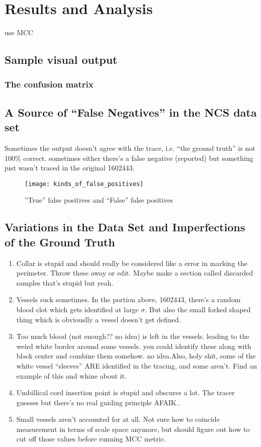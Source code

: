 
\chapter{Results and Analysis}

use MCC \cite{mcc-original-paper}
\section{Sample visual output}
\subsection{The confusion matrix}
\section{A Source of ``False Negatives'' in the NCS data set} \label{sec:NCS-dataset-issues}

Sometimes the output doesn't agree with the trace, i.e. ``the ground truth'' is not 100\% correct.
sometimes either there's a false negative (reported) but something just wasn't traced in the original  1602443.

\begin{figure} \centering
	\texttt{[image: kinds\_of\_false\_positives]}
	\caption{''True'' false positives and ``False'' false positives}
\end{figure}

\section{Variations in the Data Set and Imperfections of the Ground Truth}

\begin{enumerate}
\item Collar is stupid and should really be considered like a error in marking the perimeter. Throw these away or edit. Maybe make a section called discarded samples that's stupid but yeah.
\item Vessels suck sometimes. In the portion above, 1602443, there's a random blood clot which gets identified at large $\sigma$. But also the small forked shaped thing which is obviouslly a vessel doesn't get defined.
\item Too much blood (not enough?? no idea) is left in the vessels. leading to the weird white border around some vessels. you could identify these along with black center and combine them somehow. no idea.Also, holy shit, some of the white vessel ``sleeves'' ARE identified in the tracing, and some aren't. Find an example of this and whine about it.
\item Umbillical cord insertion point is stupid and obscures a lot. The tracer guesses but there's no real guiding principle AFAIK..
\item Small vessels aren't accounted for at all. Not sure how to coincide measurement in terms of scale space anymore, but should figure out how to cut off those values before running MCC metric.
\end{enumerate}





